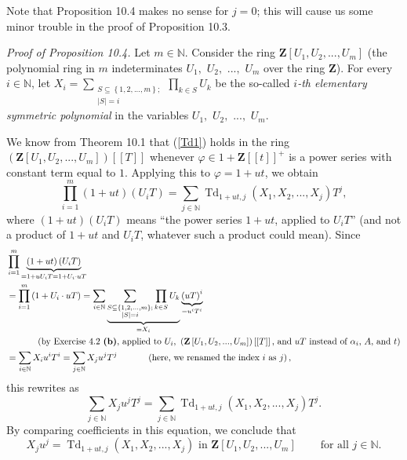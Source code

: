 \documentclass[numbers=enddot,12pt,final,onecolumn,notitlepage]{scrartcl}%
\begin{document}
Note that Proposition 10.4 makes no sense for $j=0$; this will cause us some
minor trouble in the proof of Proposition 10.3.

\textit{Proof of Proposition 10.4.} Let $m\in\mathbb{N}$. Consider the ring
$\mathbf{Z}\left[  U_{1},U_{2},...,U_{m}\right]  $ (the polynomial ring in $m$
indeterminates $U_{1},$ $U_{2},$ $...,$ $U_{m}$ over the ring $\mathbf{Z}$).
For every $i\in\mathbb{N}$, let $X_{i}=\sum\limits_{\substack{S\subseteq
\left\{  1,2,...,m\right\}  ;\\\left\vert S\right\vert =i}}\prod\limits_{k\in
S}U_{k}$ be the so-called $i$\textit{-th elementary symmetric polynomial} in
the variables $U_{1},$ $U_{2},$ $...,$ $U_{m}$.

We know from Theorem 10.1 that (\ref{Td1}) holds in the ring $\left(
\mathbf{Z}\left[  U_{1},U_{2},...,U_{m}\right]  \right)  \left[  \left[
T\right]  \right]  $ whenever $\varphi\in1+\mathbf{Z}\left[  \left[  t\right]
\right]  ^{+}$ is a power series with constant term equal to $1$. Applying
this to $\varphi=1+ut$, we obtain%
\[
\prod\limits_{i=1}^{m}\left(  1+ut\right)  \left(  U_{i}T\right)  =\sum
_{j\in\mathbb{N}}\operatorname*{Td}\nolimits_{1+ut,j}\left(  X_{1}%
,X_{2},...,X_{j}\right)  T^{j},
\]
where $\left(  1+ut\right)  \left(  U_{i}T\right)  $ means ``the power series
$1+ut$, applied to $U_{i}T$'' (and not a product of $1+ut$ and $U_{i}T$,
whatever such a product could mean). Since%
\begin{align*}
&  \prod\limits_{i=1}^{m}\underbrace{\left(  1+ut\right)  \left(
U_{i}T\right)  }_{=1+uU_{i}T=1+U_{i}\cdot uT}\\
&  =\prod\limits_{i=1}^{m}\left(  1+U_{i}\cdot uT\right)  =\sum_{i\in
\mathbb{N}}\underbrace{\sum_{\substack{S\subseteq\left\{  1,2,...,m\right\}
;\\\left\vert S\right\vert =i}}\prod_{k\in S}U_{k}}_{=X_{i}}%
\underbrace{\left(  uT\right)  ^{i}}_{=u^{i}T^{i}}\\
&  \ \ \ \ \ \ \ \ \ \ \left(  \text{by Exercise 4.2 \textbf{(b)}, applied to
}U_{i}\text{, }\left(  \mathbf{Z}\left[  U_{1},U_{2},...,U_{m}\right]
\right)  \left[  \left[  T\right]  \right]  \text{, and }uT\text{ instead of
}\alpha_{i}\text{, }A\text{, and }t\right) \\
&  =\sum_{i\in\mathbb{N}}X_{i}u^{i}T^{i}=\sum_{j\in\mathbb{N}}X_{j}u^{j}%
T^{j}\ \ \ \ \ \ \ \ \ \ \left(  \text{here, we renamed the index }i\text{ as
}j\right)  ,
\end{align*}
this rewrites as%
\[
\sum_{j\in\mathbb{N}}X_{j}u^{j}T^{j}=\sum_{j\in\mathbb{N}}\operatorname*{Td}%
\nolimits_{1+ut,j}\left(  X_{1},X_{2},...,X_{j}\right)  T^{j}.
\]
By comparing coefficients in this equation, we conclude that%
\[
X_{j}u^{j}=\operatorname*{Td}\nolimits_{1+ut,j}\left(  X_{1},X_{2}%
,...,X_{j}\right)  \text{ in }\mathbf{Z}\left[  U_{1},U_{2},...,U_{m}\right]
\ \ \ \ \ \ \ \ \ \ \text{for all }j\in\mathbb{N}\text{.}%
\]
\end{document}
